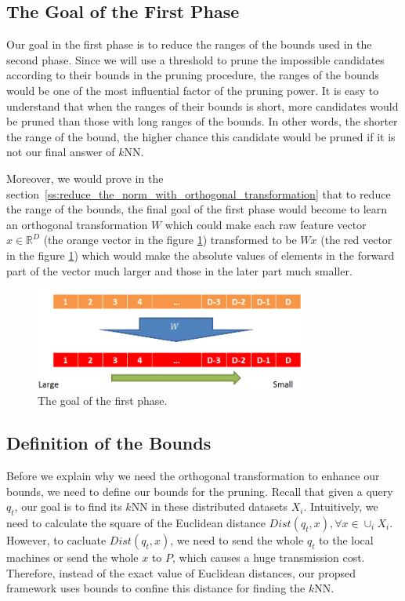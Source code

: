 \subsection{The Goal of the First Phase} %
\label{ss:the_goal_of_the_first_phase}

Our goal in the first phase is to reduce the ranges of the bounds used in the second phase.  Since we will use a threshold to prune the impossible candidates according to their bounds in the pruning procedure, the ranges of the bounds would be one of the most influential factor of the pruning power. It is easy to understand that when the ranges of their bounds is short, more candidates would be pruned than those with long ranges of the bounds.  In other words, the shorter the range of the bound, the higher chance this candidate would be pruned if it is not our final answer of $k$NN.  

Moreover, we would prove in the section~\ref{ss:reduce_the_norm_with_orthogonal_transformation} that to reduce the range of the bounds, the final goal of the first phase would become to learn an orthogonal transformation $W$ which could make each raw feature vector $x\in \mathbb{R}^D$ (the orange vector in the figure \ref{fig:vector}) transformed to be $Wx$ (the red vector in the figure \ref{fig:vector}) which would make the absolute values of elements in the forward part of the vector much larger and those in the later part much smaller.
\begin{figure}[htpb!]
  \centering
    \includegraphics[width=0.8\textwidth]{fig/important.png}
    \caption{\label{fig:vector}The goal of the first phase.}
\end{figure}



\subsection{Definition of the Bounds} %
\label{ss:definition_of_the_bounds}

Before we explain why we need the orthogonal transformation to enhance our bounds, we need to define our bounds for the pruning.  Recall that given a query $q_t$, our goal is to find its $k$NN in these distributed datasets $X_i$.  Intuitively, we need to calculate the square of the Euclidean distance $Dist(q_t,x), \forall x\in \cup_i X_i$.  However, to cacluate $Dist(q_t,x)$, we need to send the whole $q_t$ to the local machines or send the whole $x$ to $P$, which causes a huge transmission cost.  Therefore, instead of the exact value of Euclidean distances, our propsed framework uses bounds to confine this distance for finding the $k$NN.


